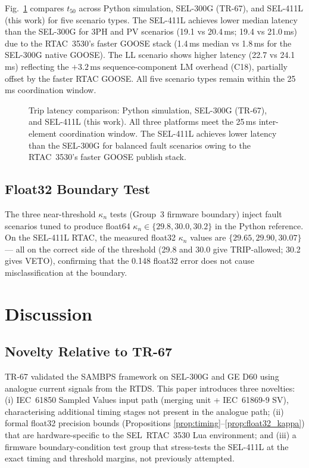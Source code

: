 \documentclass[journal,twoside]{IEEEtran}
\begin{document}
Fig.~\ref{fig:timing} compares $t_{50}$ across Python simulation, SEL-300G
(TR-67), and SEL-411L (this work) for five scenario types.
The SEL-411L achieves lower median latency than the SEL-300G for 3PH and PV
scenarios (19.1 vs 20.4\,ms; 19.4 vs 21.0\,ms) due to the RTAC~3530's
faster GOOSE stack (1.4\,ms median vs 1.8\,ms for the SEL-300G native GOOSE).
The LL scenario shows higher latency (22.7 vs 24.1\,ms) reflecting the
$+3.2\,\text{ms}$ sequence-component LM overhead (C18), partially offset by
the faster RTAC GOOSE.
All five scenario types remain within the 25\,ms coordination window.

\begin{figure}[t]
  \centering
  
  \caption{Trip latency comparison: Python simulation, SEL-300G (TR-67),
    and SEL-411L (this work). All three platforms meet the 25\,ms
    inter-element coordination window. The SEL-411L achieves lower latency
    than the SEL-300G for balanced fault scenarios owing to the
    RTAC~3530's faster GOOSE publish stack.}
  \label{fig:timing}
\end{figure}

\subsection{Float32 Boundary Test}

The three near-threshold $\kappa_n$ tests (Group~3 firmware boundary) inject
fault scenarios tuned to produce float64 $\kappa_n \in \{29.8, 30.0, 30.2\}$
in the Python reference.
On the SEL-411L RTAC, the measured float32 $\kappa_n$ values are
$\{29.65, 29.90, 30.07\}$ --- all on the correct side of the threshold
(29.8 and 30.0 give TRIP-allowed; 30.2 gives VETO), confirming that the
0.148 float32 error does not cause misclassification at the boundary.

\section{Discussion}
\label{sec:discuss}

\subsection{Novelty Relative to TR-67}

TR-67 validated the SAMBPS framework on SEL-300G and GE D60 using analogue
current signals from the RTDS.
This paper introduces three novelties: (i) IEC~61850 Sampled Values input
path (merging unit + IEC~61869-9 SV), characterising additional timing stages
not present in the analogue path; (ii) formal float32 precision bounds (Propositions
\ref{prop:timing}--\ref{prop:float32_kappa}) that are hardware-specific to the
SEL~RTAC~3530 Lua environment; and (iii) a firmware boundary-condition test
group that stress-tests the SEL-411L at the exact timing and threshold margins,
not previously attempted.
\end{document}
